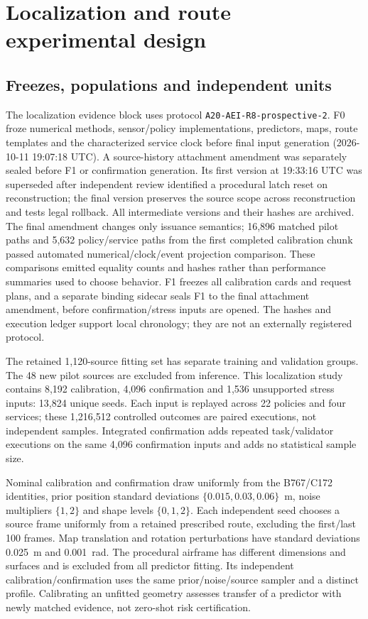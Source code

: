 \section{Localization and route experimental design}\label{sec:design}
\subsection{Freezes, populations and independent units}
The localization evidence block uses protocol \texttt{A20-AEI-R8-prospective-2}. F0 froze numerical methods, sensor/policy implementations, predictors, maps, route templates and the characterized service clock before final input generation (2026-10-11 19:07:18 UTC). A source-history attachment amendment was separately sealed before F1 or confirmation generation. Its first version at 19:33:16 UTC was superseded after independent review identified a procedural latch reset on reconstruction; the final version preserves the source scope across reconstruction and tests legal rollback. All intermediate versions and their hashes are archived. The final amendment changes only issuance semantics; 16,896 matched pilot paths and 5,632 policy/service paths from the first completed calibration chunk passed automated numerical/clock/event projection comparison. These comparisons emitted equality counts and hashes rather than performance summaries used to choose behavior. F1 freezes all calibration cards and request plans, and a separate binding sidecar seals F1 to the final attachment amendment, before confirmation/stress inputs are opened. The hashes and execution ledger support local chronology; they are not an externally registered protocol.

The retained 1,120-source fitting set has separate training and validation groups. The 48 new pilot sources are excluded from inference. This localization study contains 8,192 calibration, 4,096 confirmation and 1,536 unsupported stress inputs: 13,824 unique seeds. Each input is replayed across 22 policies and four services; these 1,216,512 controlled outcomes are paired executions, not independent samples. Integrated confirmation adds repeated task/validator executions on the same 4,096 confirmation inputs and adds no statistical sample size.

Nominal calibration and confirmation draw uniformly from the B767/C172 identities, prior position standard deviations $\{0.015,0.03,0.06\}$~m, noise multipliers $\{1,2\}$ and shape levels $\{0,1,2\}$. Each independent seed chooses a source frame uniformly from a retained prescribed route, excluding the first/last 100 frames. Map translation and rotation perturbations have standard deviations 0.025~m and 0.001~rad. The procedural airframe has different dimensions and surfaces and is excluded from all predictor fitting. Its independent calibration/confirmation uses the same prior/noise/source sampler and a distinct profile. Calibrating an unfitted geometry assesses transfer of a predictor with newly matched evidence, not zero-shot risk certification.

